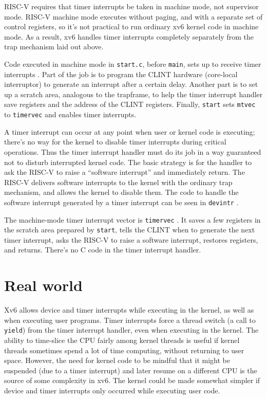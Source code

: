 RISC-V requires that timer interrupts be taken in machine mode, not
supervisor mode. RISC-V machine mode executes without paging, and with
a separate set of control registers, so it's not practical to run
ordinary xv6 kernel code in machine mode. As a result, xv6 handles
timer interrupts completely separately from the trap mechanism laid
out above.


Code executed in machine mode in {\tt start.c}, before {\tt main},
sets up to receive timer interrupts
.
Part of the job is to program the CLINT hardware (core-local interruptor)
to generate an interrupt after a certain delay.
Another part is to set up a scratch area, analogous to the trapframe,
to help
the timer interrupt handler save registers and 
the address of the CLINT registers.
Finally, {\tt start} sets {\tt mtvec} to {\tt timervec} and
enables timer interrupts.

A timer interrupt can occur at any point when user or kernel code is
executing; there's no way for the kernel to disable timer interrupts
during critical operations. Thus the timer interrupt handler must do
its job in a way guaranteed not to disturb interrupted kernel code.
The basic strategy is for the handler to ask the RISC-V to
raise a ``software interrupt'' and immediately return. The RISC-V
delivers software interrupts to the kernel with the ordinary trap
mechanism, and allows the kernel to disable them. The code to
handle the software interrupt generated by a timer interrupt can be
seen in {\tt devintr} .

The machine-mode timer interrupt vector is {\tt timervec} 
.
It saves a few registers in the scratch area prepared by {\tt start},
tells the CLINT when to generate the next timer interrupt,
asks the RISC-V to raise a software interrupt,
restores registers, and returns.
There's no C code in the timer interrupt handler.

\section{Real world}

Xv6 allows device and timer interrupts while executing in the kernel,
as well as when executing user programs. Timer interrupts force a
thread switch (a call to {\tt yield}) from the timer interrupt
handler, even when executing in the kernel. The ability to time-slice
the CPU fairly among kernel threads is useful if kernel threads
sometimes spend a lot of time computing, without returning to user
space. However, the need for kernel code to be mindful that it might
be suspended (due to a timer interrupt) and later resume on a
different CPU is the source of some complexity in xv6. The kernel
could be made somewhat simpler if device and timer interrupts only
occurred while executing user code.

